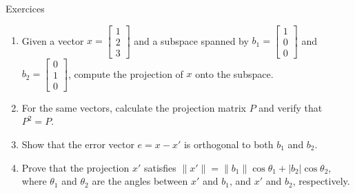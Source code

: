 \begin{frame}{Exercices}
\begin{enumerate}
    \item Given a vector $x = \begin{bmatrix} 1 \\ 2 \\ 3 \end{bmatrix}$ and a subspace spanned by $b_1 = \begin{bmatrix} 1 \\ 0 \\ 0 \end{bmatrix}$ and $b_2 = \begin{bmatrix} 0 \\ 1 \\ 0 \end{bmatrix}$, compute the projection of $x$ onto the subspace.
    \item For the same vectors, calculate the projection matrix $P$ and verify that $P^2 = P$.
    \item Show that the error vector $e = x - x'$ is orthogonal to both $b_1$ and $b_2$.
    \item Prove that the projection $x'$ satisfies $\|x'\| = \|b_1\| \cos \theta_1 + |b_2| \cos \theta_2$, where $\theta_1$ and $\theta_2$ are the angles between $x'$ and $b_1$, and $x'$ and $b_2$,
    respectively.
\end{enumerate} 
\end{frame}




